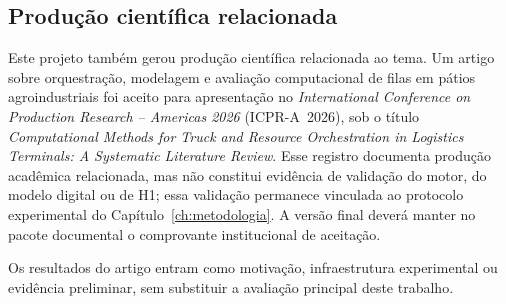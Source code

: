 \documentclass[
  12pt,
  oneside,
  a4paper,
  sumario=tradicional,
  brazil
]{abntex2}
\begin{document}
\begin{apendicesenv}
\section{Produ\c{c}\~ao cient\'ifica relacionada}

Este projeto tamb\'em gerou produ\c{c}\~ao cient\'ifica relacionada ao tema. Um artigo sobre orquestra\c{c}\~ao, modelagem e avalia\c{c}\~ao computacional de filas em p\'atios agroindustriais foi aceito para apresenta\c{c}\~ao no \textit{International Conference on Production Research -- Americas 2026} (ICPR-A~2026), sob o t\'itulo \textit{Computational Methods for Truck and Resource Orchestration in Logistics Terminals: A Systematic Literature Review}. Esse registro documenta produ\c{c}\~ao acad\^emica relacionada, mas n\~ao constitui evid\^encia de valida\c{c}\~ao do motor, do modelo digital ou de H1; essa valida\c{c}\~ao permanece vinculada ao protocolo experimental do Cap\'itulo~\ref{ch:metodologia}. A vers\~ao final dever\'a manter no pacote documental o comprovante institucional de aceita\c{c}\~ao.

Os resultados do artigo entram como motiva\c{c}\~ao, infraestrutura experimental ou evid\^encia preliminar, sem substituir a avalia\c{c}\~ao principal deste trabalho.

\end{apendicesenv}

\postextual
\printbibliography[heading=bibintoc,title={REFER\^ENCIAS}]
\end{document}
